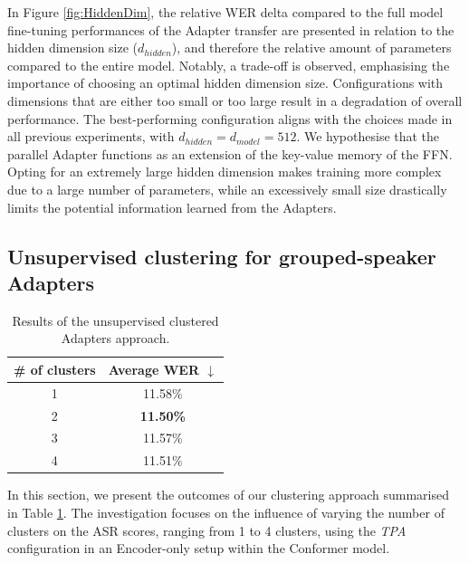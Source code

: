 In Figure \ref{fig:HiddenDim}, the relative \ac{WER} delta compared to the full model fine-tuning performances of the Adapter transfer are presented in relation to the hidden dimension size ($d_{hidden}$), and therefore the relative amount of parameters compared to the entire model. Notably, a trade-off is observed, emphasising the importance of choosing an optimal hidden dimension size. Configurations with dimensions that are either too small or too large result in a degradation of overall performance. The best-performing configuration aligns with the choices made in all previous experiments, with $d_{hidden} = d_{model} = 512$. We hypothesise that the parallel Adapter functions as an extension of the key-value memory of the \ac{FFN}. Opting for an extremely large hidden dimension makes training more complex due to a large number of parameters, while an excessively small size drastically limits the potential information learned from the Adapters. 

\subsection{Unsupervised clustering for grouped-speaker Adapters}
\label{sec:clustering_emb}
\begin{table}[t]
    \begin{center}    
    \begin{tabular}{cc}
    \hline
      \# of clusters & Average WER $\downarrow$    \\ \hline
    \multicolumn{1}{c}{1} & 11.58\%  \\%
    \multicolumn{1}{c}{2} & \textbf{11.50\%}  \\
    \multicolumn{1}{c}{3} & 11.57\%  \\
    \multicolumn{1}{c}{4} & 11.51\%  \\ \hline 
    \end{tabular}
    \end{center}
    \caption{Results of the unsupervised clustered Adapters approach.}
    \label{tab:res_clusters}
    \end{table}


In this section, we present the outcomes of our clustering approach summarised in Table \ref{tab:res_clusters}. The investigation focuses on the influence of varying the number of clusters on the \ac{ASR} scores, ranging from 1 to 4 clusters, using the \textit{\ac{TPA}} configuration in an Encoder-only setup within the Conformer model.

